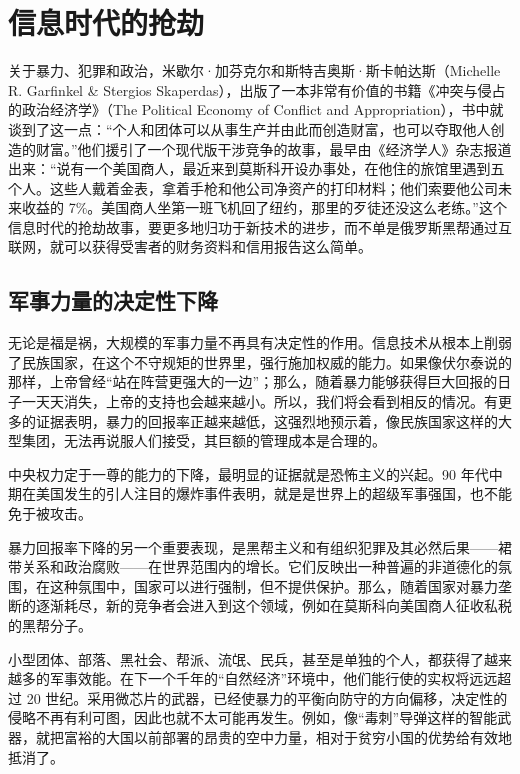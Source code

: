 \section{信息时代的抢劫}

关于暴力、犯罪和政治，米歇尔·加芬克尔和斯特吉奥斯·斯卡帕达斯（Michelle R. Garfinkel \& Stergios Skaperdas），出版了一本非常有价值的书籍《冲突与侵占的政治经济学》（The Political Economy of Conflict and Appropriation），书中就谈到了这一点：“个人和团体可以从事生产并由此而创造财富，也可以夺取他人创造的财富。”他们援引了一个现代版干涉竞争的故事，最早由《经济学人》杂志报道出来：“说有一个美国商人，最近来到莫斯科开设办事处，在他住的旅馆里遇到五个人。这些人戴着金表，拿着手枪和他公司净资产的打印材料；他们索要他公司未来收益的 7\%。美国商人坐第一班飞机回了纽约，那里的歹徒还没这么老练。”这个信息时代的抢劫故事，要更多地归功于新技术的进步，而不单是俄罗斯黑帮通过互联网，就可以获得受害者的财务资料和信用报告这么简单。

\subsection{军事力量的决定性下降}

无论是福是祸，大规模的军事力量不再具有决定性的作用。信息技术从根本上削弱了民族国家，在这个不守规矩的世界里，强行施加权威的能力。如果像伏尔泰说的那样，上帝曾经“站在阵营更强大的一边”；那么，随着暴力能够获得巨大回报的日子一天天消失，上帝的支持也会越来越小。所以，我们将会看到相反的情况。有更多的证据表明，暴力的回报率正越来越低，这强烈地预示着，像民族国家这样的大型集团，无法再说服人们接受，其巨额的管理成本是合理的。

中央权力定于一尊的能力的下降，最明显的证据就是恐怖主义的兴起。90 年代中期在美国发生的引人注目的爆炸事件表明，就是是世界上的超级军事强国，也不能免于被攻击。

暴力回报率下降的另一个重要表现，是黑帮主义和有组织犯罪及其必然后果——裙带关系和政治腐败——在世界范围内的增长。它们反映出一种普遍的非道德化的氛围，在这种氛围中，国家可以进行强制，但不提供保护。那么，随着国家对暴力垄断的逐渐耗尽，新的竞争者会进入到这个领域，例如在莫斯科向美国商人征收私税的黑帮分子。

小型团体、部落、黑社会、帮派、流氓、民兵，甚至是单独的个人，都获得了越来越多的军事效能。在下一个千年的“自然经济”环境中，他们能行使的实权将远远超过 20 世纪。采用微芯片的武器，已经使暴力的平衡向防守的方向偏移，决定性的侵略不再有利可图，因此也就不太可能再发生。例如，像“毒刺”导弹这样的智能武器，就把富裕的大国以前部署的昂贵的空中力量，相对于贫穷小国的优势给有效地抵消了。

